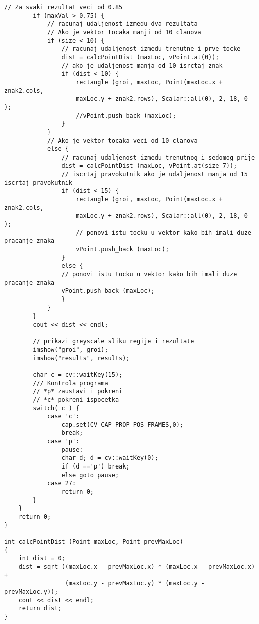 \begin{lstlisting}[caption={}]
        // Za svaki rezultat veci od 0.85 
        if (maxVal > 0.75) {
            // racunaj udaljenost izmedu dva rezultata
            // Ako je vektor tocaka manji od 10 clanova
            if (size < 10) {
                // racunaj udaljenost izmedu trenutne i prve tocke
                dist = calcPointDist (maxLoc, vPoint.at(0));
                // ako je udaljenost manja od 10 isrctaj znak
                if (dist < 10) {
                    rectangle (groi, maxLoc, Point(maxLoc.x + znak2.cols, 
                    maxLoc.y + znak2.rows), Scalar::all(0), 2, 18, 0 );
                    //vPoint.push_back (maxLoc);    
                }
            }
            // Ako je vektor tocaka veci od 10 clanova
            else {
                // racunaj udaljenost izmedu trenutnog i sedomog prije 
                dist = calcPointDist (maxLoc, vPoint.at(size-7));  
                // iscrtaj pravokutnik ako je udaljenost manja od 15 iscrtaj pravokutnik
                if (dist < 15) {
                    rectangle (groi, maxLoc, Point(maxLoc.x + znak2.cols, 
                    maxLoc.y + znak2.rows), Scalar::all(0), 2, 18, 0 );
                    // ponovi istu tocku u vektor kako bih imali duze pracanje znaka
                    vPoint.push_back (maxLoc);  
                }
                else {
                // ponovi istu tocku u vektor kako bih imali duze pracanje znaka
                vPoint.push_back (maxLoc);
                }
            }
        }
        cout << dist << endl;
        
        // prikazi greyscale sliku regije i rezultate
        imshow("groi", groi);
        imshow("results", results);
        
        char c = cv::waitKey(15);
        /// Kontrola programa         
        // *p* zaustavi i pokreni
        // *c* pokreni ispocetka
        switch( c ) {
            case 'c': 
                cap.set(CV_CAP_PROP_POS_FRAMES,0); 
                break;    
            case 'p': 
                pause:
                char d; d = cv::waitKey(0);
                if (d =='p') break;
                else goto pause;
            case 27:
                return 0;
        }        
    }
    return 0;
}

int calcPointDist (Point maxLoc, Point prevMaxLoc)
{
    int dist = 0;
    dist = sqrt ((maxLoc.x - prevMaxLoc.x) * (maxLoc.x - prevMaxLoc.x) +
                 (maxLoc.y - prevMaxLoc.y) * (maxLoc.y - prevMaxLoc.y));    
    cout << dist << endl;
    return dist;
}
\end{lstlisting}


